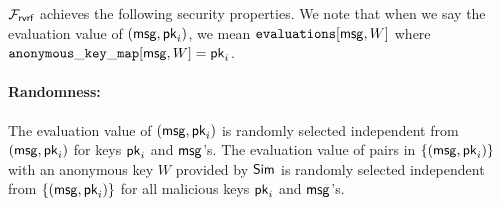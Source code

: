 	$ \mathcal{F}_{\textsf{rvrf}} $  achieves the following security properties. We note that when we say the evaluation value of $ (\mathsf{msg}, \mathsf{pk}_i) $, we mean $ \texttt{evaluations}[\mathsf{msg},W] $ where $ \mathtt{anonymous\_key\_map}[\mathsf{msg},W] = \mathsf{pk}_i $.
	
	\paragraph{Randomness:}  The evaluation value of $ (\mathsf{msg}, \mathsf{pk}_i) $ is randomly selected independent from $ (\mathsf{msg}, \mathsf{pk}_i) $ for keys $ \mathsf{pk}_i $ and $ \mathsf{msg} $'s. The evaluation value of pairs in $ \{(\mathsf{msg}, \mathsf{pk}_i)\} $  with an anonymous key $ W $ provided by $ \mathsf{Sim} $  is randomly selected independent from $ \{(\mathsf{msg}, \mathsf{pk}_i)\} $ for all malicious keys $ \mathsf{pk}_i  $ and $ \mathsf{msg} $'s.
	
